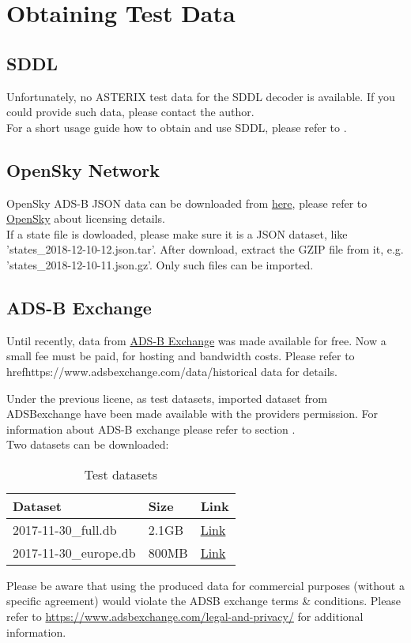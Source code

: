 \section{Obtaining Test Data}
\label{sec:test_data} 

\subsection{SDDL}

Unfortunately, no ASTERIX test data for the SDDL decoder is available. If you could provide such data, please contact the author. \\

For a short usage guide how to obtain and use SDDL, please refer to .

\subsection{OpenSky Network}

OpenSky ADS-B JSON data can be downloaded from \href{https://opensky-network.org/datasets/states/}{here}, please refer to \href{https://opensky-network.org/}{OpenSky} about licensing details. \\

If a state file is dowloaded, please make sure it is a JSON dataset, like 'states\_2018-12-10-12.json.tar'. After download, extract the GZIP file from it, e.g. 'states\_2018-12-10-11.json.gz'. Only such files can be imported.

\subsection{ADS-B Exchange}

Until recently, data from \href{https://www.adsbexchange.com/}{ADS-B Exchange} was made available for free. Now a small fee must be paid, for hosting and bandwidth costs. Please refer to href{https://www.adsbexchange.com/data/}{historical data} for details.

Under the previous licene, as test datasets, imported dataset from ADSBexchange have been made available with the providers permission. For information about ADS-B exchange please refer to section . \\

Two datasets can be downloaded:

\begin{table}[H]
  \center
  \begin{tabular}{ | l | l | l |}
    \hline
    \textbf{Dataset} & Size & \textbf{Link} \\ \hline
    2017-11-30\_full.db & 2.1GB & \href{https://drive.google.com/open?id=19JgE8kgVG2lodIyI6Vo8ac7aNY7pM1i_}{Link} \\ \hline
    2017-11-30\_europe.db & 800MB & \href{https://drive.google.com/open?id=1s73R9IEq_8KePC96-a2_seXxZ-Ybhisd}{Link} \\
    \hline
  \end{tabular}
  \caption{Test datasets}
\end{table}

Please be aware that using the produced data for commercial purposes (without a specific agreement) would violate the ADSB exchange terms \& conditions. Please refer to \url{https://www.adsbexchange.com/legal-and-privacy/} for additional information.

